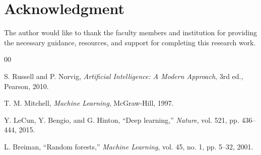 \documentclass[conference]{IEEEtran}
\begin{document}

\section*{Acknowledgment}

The author would like to thank the faculty members and
institution for providing the necessary guidance, resources,
and support for completing this research work.


\begin{thebibliography}{00}

S. Russell and P. Norvig,
\textit{Artificial Intelligence: A Modern Approach},
3rd ed., Pearson, 2010.

T. M. Mitchell,
\textit{Machine Learning},
McGraw-Hill, 1997.

Y. LeCun, Y. Bengio, and G. Hinton,
``Deep learning,''
\textit{Nature},
vol. 521, pp. 436--444, 2015.

L. Breiman,
``Random forests,''
\textit{Machine Learning},
vol. 45, no. 1, pp. 5--32, 2001.

\end{thebibliography}
\end{document}
